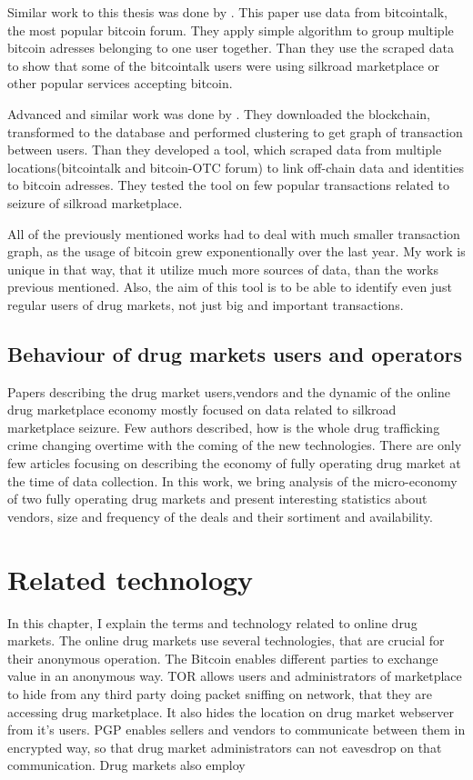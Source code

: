 \documentclass[
  digital, %
  table,   %
  lof,     %
  lot,     %
  oneside
]{fithesis3}
\begin{document}
Similar work to this thesis was done by \parencite{fleder2015bitcoin}. This paper use data from bitcointalk, the most popular bitcoin forum. 
They apply simple algorithm to group multiple bitcoin adresses belonging to one user together. Than they use the scraped data to show
that some of the bitcointalk users were using silkroad marketplace or other popular services accepting bitcoin.

Advanced and similar work was done by \parencite{spagnuolo2014bitiodine}. They downloaded the blockchain, transformed to the database
and performed clustering to get graph of transaction between users.
Than they developed a tool, which scraped data from multiple locations(bitcointalk and bitcoin-OTC forum) to link off-chain data and identities to bitcoin adresses.
They tested the tool on few popular transactions related to seizure of silkroad marketplace.

All of the previously mentioned works had to deal with much smaller transaction graph, as the usage of bitcoin grew exponentionally over the last year. 
My work is unique in that way, that it utilize much more sources of data, than the works previous mentioned. Also, the aim of this tool is to be able
to identify even just regular users of drug markets, not just big and important transactions.

\section{Behaviour of drug markets users and operators}

Papers describing the drug market users,vendors and the dynamic of
the online drug marketplace economy mostly focused on data related to silkroad marketplace seizure. 
Few authors described, how is the whole drug trafficking crime changing overtime with the coming of the new technologies.
There are only few articles focusing on describing the economy of fully operating drug market at the time of data collection.
In this work, we bring analysis of the micro-economy of two fully operating drug markets and present interesting statistics about vendors,
size and frequency of the deals and their sortiment and availability.

\chapter{Related technology}

In this chapter, I explain the terms and technology related to online drug markets.
The online drug markets use several technologies, that are crucial for their anonymous operation.
The Bitcoin enables different parties to exchange value in an anonymous way.
TOR allows users and administrators of marketplace to hide from any third party doing packet sniffing on network,
that they are accessing drug marketplace. It also hides the location on drug market webserver from it's users.
PGP enables sellers and vendors to communicate between them in encrypted way,
so that drug market administrators can not eavesdrop on that communication.
Drug markets also employ
\end{document}
